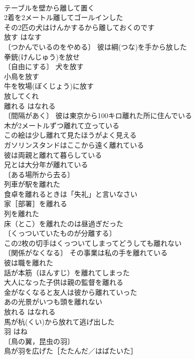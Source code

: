\documentclass[8pt]{extreport}
\begin{document}
\begin{CJK}{UTF8}{min}
\\	テーブルを壁から離して置く 
\\	2着を2メートル離してゴールインした 
\\	その2匹の犬はけんかするから離しておくのです 
\\	放す	はなす	
\\	〔つかんでいるのをやめる〕 彼は綱(つな)を手から放した 
\\	拳銃(けんじゅう)を放せ 
\\	〔自由にする〕 犬を放す 
\\	小鳥を放す 
\\	牛を牧場(ぼくじょう)に放す 
\\	放してくれ 
\\	離れる	はなれる	
\\	〔間隔があく〕 彼は東京から100キロ離れた所に住んでいる 
\\	木が2メートルずつ離れて立っている 
\\	この絵は少し離れて見たほうがよく見える 
\\	ガソリンスタンドはここから遠く離れている 
\\	彼は両親と離れて暮らしている 
\\	兄とは大分年が離れている 
\\	〔ある場所から去る〕
\\	列車が駅を離れた 
\\	食卓を離れるときは「失礼」と言いなさい 
\\	家［部署］を離れる 
\\	列を離れた 
\\	床（とこ）を離れたのは昼過ぎだった 
\\	〔くっついていたものが分離する〕
\\	この2枚の切手はくっついてしまってどうしても離れない 
\\	〔関係がなくなる〕 その事業は私の手を離れている 
\\	彼は職を離れた 
\\	話が本筋（ほんすじ）を離れてしまった 
\\	大人になった子供は親の監督を離れる 
\\	金がなくなると友人は彼から離れていった 
\\	あの光景がいつも頭を離れない 
\\	放れる	はなれる	
\\	馬が杭(くい)から放れて逃げ出した 
\\	羽	はね	
\\	〔鳥の翼，昆虫の羽〕
\\	鳥が羽を広げた［たたんだ／はばたいた］ 

\end{CJK}
\end{document}
